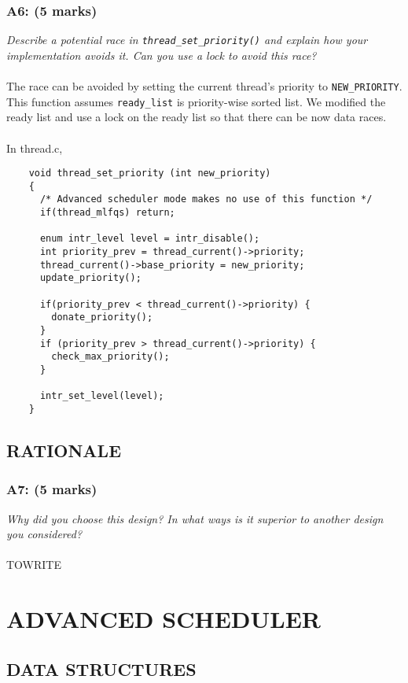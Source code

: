 \documentclass{article}
\begin{document}
\subsubsection*{A6: (5 marks) }
\textit{Describe a potential race in \texttt{thread\_set\_priority()} and explain how your implementation avoids it.  Can you use a lock to avoid this race?}
\\ \\
The race can be avoided by setting the current thread's priority to \texttt{NEW\_PRIORITY}. This function assumes \texttt{ready\_list} is priority-wise sorted list. We modified the ready list and use a lock on the ready list so that there can be now data races.
\\ \\
In thread.c,
\begin{lstlisting}
    void thread_set_priority (int new_priority)
    {
      /* Advanced scheduler mode makes no use of this function */
      if(thread_mlfqs) return;

      enum intr_level level = intr_disable();
      int priority_prev = thread_current()->priority;
      thread_current()->base_priority = new_priority;
      update_priority();

      if(priority_prev < thread_current()->priority) {
        donate_priority();
      }
      if (priority_prev > thread_current()->priority) {
        check_max_priority();
      }

      intr_set_level(level);
    }
\end{lstlisting}


\subsection{RATIONALE}

\subsubsection*{A7: (5 marks) }
\textit{Why did you choose this design?  In what ways is it superior to another design you considered?}
\\ \\
TOWRITE


\section{ADVANCED SCHEDULER}

\subsection{DATA STRUCTURES}
\end{document}
